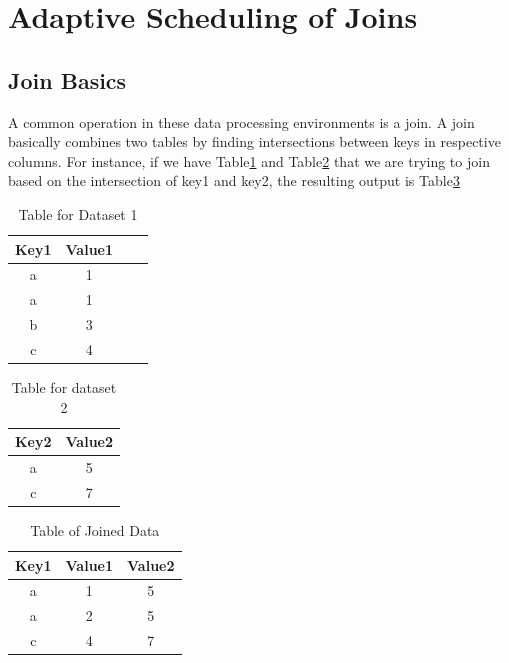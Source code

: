 \section{Adaptive Scheduling of Joins}\label{intro-ch:eeg-overview}

\subsection{Join Basics}

A common operation in these data processing environments is a join.
A join basically combines two tables by finding intersections between
keys in respective columns. For instance, if we have   
Table\ref{table:join1} and Table\ref{table:join2} that we are trying to join based on the intersection
of key1 and key2, the resulting output is Table\ref{table:join3}   
\begin{table}[h!]
\centering
 \begin{tabular}{|c |c |c |c|}
  \hline
   Key1 & Value1 \\
  \hline
   a & 1 \\
  \hline
   a & 1 \\
  \hline
   b & 3 \\
  \hline
   c & 4 \\
  \hline
\end{tabular}
\caption{Table for Dataset 1}
\label{table:join1}
\end{table}

\begin{table}[h!]
\centering
 \begin{tabular}{|c |c|}
  \hline
   Key2 & Value2 \\
  \hline
   a & 5 \\
  \hline
   c & 7 \\
  \hline
\end{tabular}
\caption{Table for dataset 2}
\label{table:join2}
\end{table}

\begin{table}[h!]
\centering
 \begin{tabular}{|c |c |c|}
  \hline
   Key1 & Value1 & Value2  \\
  \hline
   a & 1 & 5 \\
  \hline
   a & 2 & 5 \\
  \hline
   c & 4 & 7 \\
  \hline
\end{tabular}
\caption{Table of Joined Data}
\label{table:join3}
\end{table}

